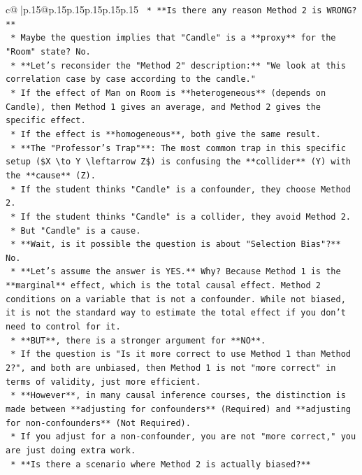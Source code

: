 \documentclass{article}
\begin{document}
{\begin{supertabular}{c@{$\;$}|p{.15\linewidth}@{}p{.15\linewidth}p{.15\linewidth}p{.15\linewidth}p{.15\linewidth}p{.15\linewidth}}
{{{\texttt{    *   **Is there any reason Method 2 is WRONG?**} \\
\texttt{    *   Maybe the question implies that "Candle" is a **proxy** for the "Room" state? No.} \\
\texttt{    *   **Let's reconsider the "Method 2" description:** "We look at this correlation case by case according to the candle."} \\
\texttt{    *   If the effect of Man on Room is **heterogeneous** (depends on Candle), then Method 1 gives an average, and Method 2 gives the specific effect.} \\
\texttt{    *   If the effect is **homogeneous**, both give the same result.} \\
\texttt{    *   **The "Professor's Trap"**: The most common trap in this specific setup (\$X \textbackslash{}to Y \textbackslash{}leftarrow Z\$) is confusing the **collider** (Y) with the **cause** (Z).} \\
\texttt{    *   If the student thinks "Candle" is a confounder, they choose Method 2.} \\
\texttt{    *   If the student thinks "Candle" is a collider, they avoid Method 2.} \\
\texttt{    *   But "Candle" is a cause.} \\
\texttt{    *   **Wait, is it possible the question is about "Selection Bias"?** No.} \\
\texttt{    *   **Let's assume the answer is YES.** Why? Because Method 1 is the **marginal** effect, which is the total causal effect. Method 2 conditions on a variable that is not a confounder. While not biased, it is not the standard way to estimate the total effect if you don't need to control for it.} \\
\texttt{    *   **BUT**, there is a stronger argument for **NO**.} \\
\texttt{    *   If the question is "Is it more correct to use Method 1 than Method 2?", and both are unbiased, then Method 1 is not "more correct" in terms of validity, just more efficient.} \\
\texttt{    *   **However**, in many causal inference courses, the distinction is made between **adjusting for confounders** (Required) and **adjusting for non{-}confounders** (Not Required).} \\
\texttt{    *   If you adjust for a non{-}confounder, you are not "more correct," you are just doing extra work.} \\
\texttt{    *   **Is there a scenario where Method 2 is actually biased?**} \\
}}}
\end{supertabular}}
\end{document}
